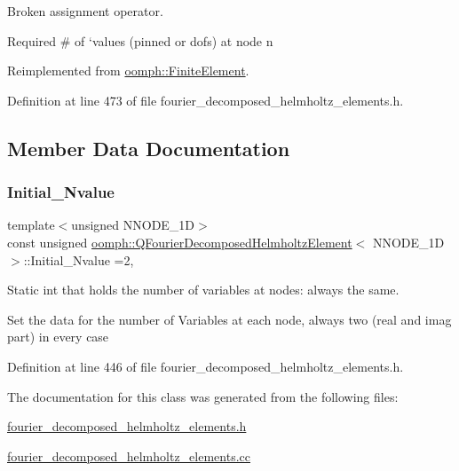 Broken assignment operator. 

Required \# of `values\textquotesingle{} (pinned or dofs) at node n 

Reimplemented from \hyperlink{classoomph_1_1FiniteElement_a56610c60d5bc2d7c27407a1455471b1a}{oomph\+::\+Finite\+Element}.



Definition at line 473 of file fourier\+\_\+decomposed\+\_\+helmholtz\+\_\+elements.\+h.



\subsection{Member Data Documentation}
\mbox{\label{classoomph_1_1QFourierDecomposedHelmholtzElement_a58d9cdd8eb3163b440a8c727f4d071e3}} 
\subsubsection{\texorpdfstring{Initial\+\_\+\+Nvalue}{Initial\_Nvalue}}
{\footnotesize\ttfamily template$<$unsigned N\+N\+O\+D\+E\+\_\+1D$>$ \\
const unsigned \hyperlink{classoomph_1_1QFourierDecomposedHelmholtzElement}{oomph\+::\+Q\+Fourier\+Decomposed\+Helmholtz\+Element}$<$ N\+N\+O\+D\+E\+\_\+1D $>$\+::Initial\+\_\+\+Nvalue =2\hspace{0.3cm}{\ttfamily [static]}, {\ttfamily [private]}}



Static int that holds the number of variables at nodes\+: always the same. 

Set the data for the number of Variables at each node, always two (real and imag part) in every case 

Definition at line 446 of file fourier\+\_\+decomposed\+\_\+helmholtz\+\_\+elements.\+h.



The documentation for this class was generated from the following files\+:\begin{DoxyCompactItemize}
\item 
\hyperlink{fourier__decomposed__helmholtz__elements_8h}{fourier\+\_\+decomposed\+\_\+helmholtz\+\_\+elements.\+h}\item 
\hyperlink{fourier__decomposed__helmholtz__elements_8cc}{fourier\+\_\+decomposed\+\_\+helmholtz\+\_\+elements.\+cc}\end{DoxyCompactItemize}
